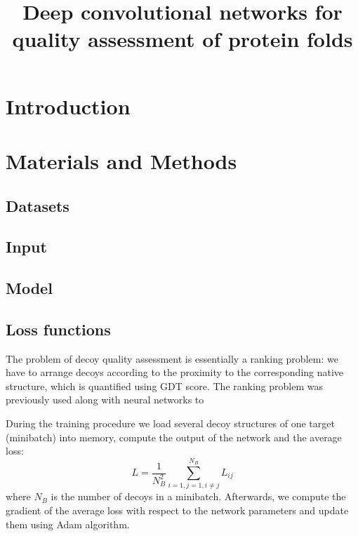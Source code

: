 \documentclass[letter,10pt]{article}
\title{Deep convolutional networks for quality assessment of protein folds}
\author{}
\begin{document}
\maketitle

\begin{abstract}

\end{abstract}

\section{Introduction}


\section{Materials and Methods}

\subsection{Datasets}

%

\subsection{Input}
% 

\subsection{Model}
% 

\subsection{Loss functions}

The problem of decoy quality assessment is essentially a ranking problem: we have to arrange decoys according to 
the proximity to the corresponding native structure, which is quantified using GDT score. The ranking problem 
was previously used along with neural networks to 

During the training procedure we load several decoy structures of one target (minibatch) into memory, compute the 
output of the network and the average loss:
$$ L = \frac{1}{N^{2}_B} \sum_{i=1,j=1, i \neq j}^{N_B} L_{ij} $$ 
where $N_B$ is the number of decoys in a minibatch. Afterwards, we compute the gradient of the average loss with respect 
to the network parameters and update them using Adam algorithm.
\end{document}
